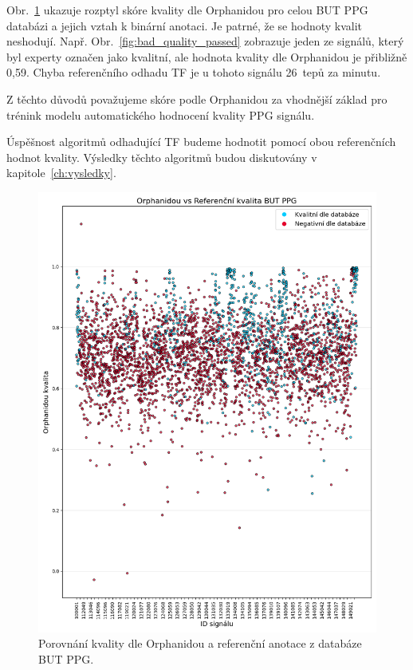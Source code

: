 Obr.~\ref{fig:orphanidou_mismatch} ukazuje rozptyl skóre kvality dle Orphanidou pro celou \acs{BUT PPG} databázi a jejich vztah k binární anotaci.
Je patrné, že se hodnoty kvalit neshodují.
Např. Obr.~\ref{fig:bad_quality_passed} zobrazuje jeden ze signálů, který byl experty označen jako kvalitní, ale hodnota kvality dle Orphanidou je přibližně 0,59.
Chyba referenčního odhadu \acs{TF} je u tohoto signálu 26~tepů za minutu.

Z těchto důvodů považujeme skóre podle Orphanidou za vhodnější základ pro trénink modelu automatického hodnocení kvality PPG signálu.

Úspěšnost algoritmů odhadující \acs{TF} budeme hodnotit pomocí obou referenčních hodnot kvality.
Výsledky těchto algoritmů budou diskutovány v kapitole~\ref{ch:vysledky}.

\begin{figure}[ht]
	\centering
	\includegraphics[width=1\textwidth]{./obrazky/quality/Orphanidou_Ref_Q.png}
	\caption[Porovnání kvality dle Orphanidou a referenční anotace z databáze \acs{BUT PPG}]{Porovnání kvality dle Orphanidou a referenční anotace z databáze \acs{BUT PPG}.}
	\label{fig:orphanidou_mismatch}
\end{figure}

